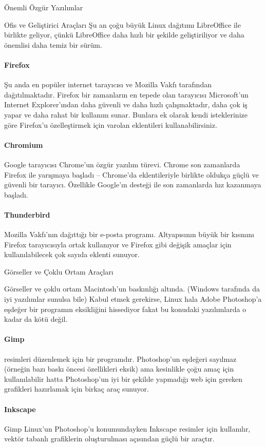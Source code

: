 \begin{section}{Önemli Özgür Yazılımlar}
\begin{subsection}{Ofis ve Geliştirici Araçları}
Şu an çoğu büyük Linux dağıtımı LibreOffice ile birlikte geliyor, çünkü LibreOffice daha hızlı bir şekilde geliştiriliyor ve daha önemlisi daha temiz bir sürüm.
\paragraph{Firefox}{Şu anda en popüler internet tarayıcısı ve Mozilla Vakfı tarafından dağıtılmaktadır. Firefox bir zamanların en tepede olan tarayıcısı Microsoft'un Internet Explorer'ından daha güvenli ve daha hızlı çalışmaktadır, daha çok iş yapar ve daha rahat bir kullanım sunar. Bunlara ek olarak kendi isteklerinize göre Firefox'u özelleştirmek için varolan eklentileri kullanabilirsiniz.}
\paragraph{Chromium}{Google tarayıcısı Chrome'un özgür yazılım türevi. Chrome son zamanlarda Firefox ile yarışmaya başladı – Chrome'da eklentileriyle birlikte oldukça güçlü ve güvenli bir tarayıcı. Özellikle Google'ın desteği ile son zamanlarda hız kazanmaya başladı.}
\paragraph{Thunderbird}{Mozilla Vakfı'nın dağıttığı bir e-posta programı. Altyapısının büyük bir kısmını Firefox tarayıcısıyla ortak kullanıyor ve Firefox gibi değişik amaçlar için kullanılabilecek çok sayıda eklenti sunuyor.}
\end{subsection}
\begin{subsection}{Görseller ve Çoklu Ortam Araçları}

Görseller ve çoklu ortam Macintosh'un baskınlığı altında. (Windows tarafında da iyi yazılımlar sunulsa bile) Kabul etmek gerekirse, Linux hala Adobe Photoshop'a eşdeğer bir programın eksikliğini hissediyor fakat bu konudaki yazılımlarda o kadar da kötü değil.

\paragraph{Gimp}{resimleri düzenlemek için bir programdır. Photoshop'un eşdeğeri sayılmaz (örneğin bazı baskı öncesi özellikleri eksik) ama kesinlikle çoğu amaç için kullanılabilir hatta Photoshop'un iyi bir şekilde yapmadığı web için gereken grafikleri hazırlamak için birkaç araç sunuyor.}
\paragraph{Inkscape}{Gimp Linux'un Photoshop'u konumundayken Inkscape resimler için kullanılır, vektör tabanlı grafiklerin oluşturulması açısından güçlü bir araçtır.}

\end{subsection}
\end{section}
